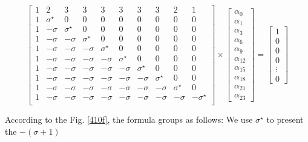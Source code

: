 \begin{small}
\begin{equation}
{
\left[ \begin{array}{cccccccccc}
1 & 2 & 3 & 3 & 3 & 3 & 3 & 3 & 2 & 1\\
1 & {\sigma}^{\star} & 0 & 0 & 0 & 0 & 0 & 0 & 0 & 0\\
1 & -\sigma & {\sigma}^{\star} & 0 & 0 & 0 & 0 & 0 & 0 & 0 \\
1 & -\sigma & -\sigma & {\sigma}^{\star} & 0 & 0 & 0 & 0 & 0 & 0 \\
1 & -\sigma & -\sigma & -\sigma & {\sigma}^{\star} & 0 & 0 & 0 & 0 & 0\\
1 & -\sigma & -\sigma & -\sigma & -\sigma & {\sigma}^{\star} & 0 & 0 & 0 & 0\\
1 & -\sigma & -\sigma & -\sigma & -\sigma & -\sigma & {\sigma}^{\star} & 0 & 0 & 0\\
1 & -\sigma & -\sigma & -\sigma & -\sigma & -\sigma & -\sigma & {\sigma}^{\star} & 0 & 0\\
1 & -\sigma & -\sigma & -\sigma & -\sigma & -\sigma & -\sigma & -\sigma & {\sigma}^{\star} & 0\\
1 & -\sigma & -\sigma & -\sigma & -\sigma & -\sigma & -\sigma & -\sigma & -\sigma & -{\sigma}^{\star} \\
\end{array} 
\right ]} \times \left[ \begin{array}{c}
\alpha_{0} \\
\alpha_{1} \\
\alpha_{3} \\
\alpha_{6} \\
\alpha_{9} \\
\alpha_{12}\\
\alpha_{15}\\
\alpha_{18}\\
\alpha_{21}\\
\alpha_{23}
\end{array} 
\right ] = \left[ \begin{array}{c}
1 \\
0 \\
0 \\
0 \\
\vdots \\
0
\end{array} 
\right ]
\end{equation}
\end{small}


\vspace*{50pt}
According to the Fig. \ref{410f}, the formula groups as follows:
We use ${\sigma}^{\star}$ to present the $-(\sigma + 1)$

